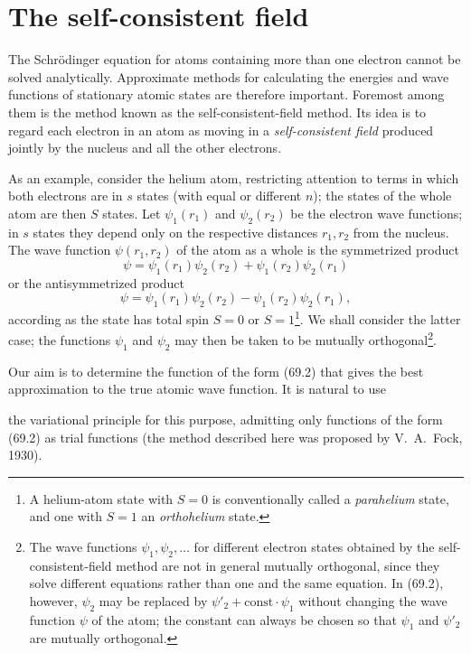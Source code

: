 \section{The self-consistent field}

The Schrödinger equation for atoms containing more than one electron cannot be solved analytically. Approximate methods for calculating the energies and wave functions of stationary atomic states are therefore important. Foremost among them is the method known as the self-consistent-field method. Its idea is to regard each electron in an atom as moving in a \emph{self-consistent field} produced jointly by the nucleus and all the other electrons.

As an example, consider the helium atom, restricting attention to terms in which both electrons are in $s$ states (with equal or different $n$); the states of the whole atom are then $S$ states. Let $\psi_1(r_1)$ and $\psi_2(r_2)$ be the electron wave functions; in $s$ states they depend only on the respective distances $r_1,r_2$ from the nucleus. The wave function $\psi(r_1,r_2)$ of the atom as a whole is the symmetrized product
\begin{equation}
 \psi=\psi_1(r_1)\psi_2(r_2)+\psi_1(r_2)\psi_2(r_1)
 \tag{69.1}
\end{equation}
or the antisymmetrized product
\begin{equation}
 \psi=\psi_1(r_1)\psi_2(r_2)-\psi_1(r_2)\psi_2(r_1),
 \tag{69.2}
\end{equation}
according as the state has total spin $S=0$ or $S=1$\footnote{A helium-atom state with $S=0$ is conventionally called a \emph{parahelium} state, and one with $S=1$ an \emph{orthohelium} state.}. We shall consider the latter case; the functions $\psi_1$ and $\psi_2$ may then be taken to be mutually orthogonal\footnote{The wave functions $\psi_1,\psi_2,\ldots$ for different electron states obtained by the self-consistent-field method are not in general mutually orthogonal, since they solve different equations rather than one and the same equation. In (69.2), however, $\psi_2$ may be replaced by $\psi'_2+\mathrm{const}\cdot\psi_1$ without changing the wave function $\psi$ of the atom; the constant can always be chosen so that $\psi_1$ and $\psi'_2$ are mutually orthogonal.}.

Our aim is to determine the function of the form (69.2) that gives the best approximation to the true atomic wave function. It is natural to use

the variational principle for this purpose, admitting only functions of the form (69.2) as trial functions (the method described here was proposed by V.~A.~Fock, 1930).

